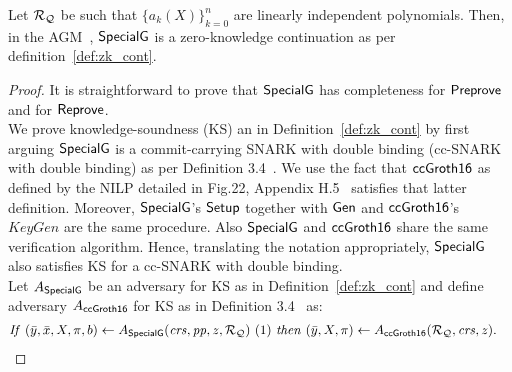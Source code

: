 \begin{theorem}
\label{sec_specialg}
Let $\mathcal{R}_{\mathcal{Q}}$ be such that $\{a_k(X)\}_{k=0}^n$ are linearly independent polynomials. Then, in the 
AGM~\cite{Fuchs_AGM}, ${\mathsf{SpecialG}}$ is a zero-knowledge continuation as per definition~\ref{def:zk_cont}. 
\end{theorem}
\begin{proof} It is straightforward to prove that ${\mathsf{SpecialG}}$ has completeness for ${\mathsf{Preprove}}$ and for ${\mathsf{Reprove}}$. \\

\noindent We prove knowledge-soundness (KS) an in Definition~\ref{def:zk_cont} by first arguing ${\mathsf{SpecialG}}$ is a 
commit-carrying SNARK with double binding (cc-SNARK with double binding) as per Definition 3.4~\cite{LegoSNARK}. 
We use the fact that ${\mathsf{ccGroth16}}$ as defined by the NILP detailed in Fig.22, Appendix H.5~\cite{LegoSNARK} satisfies that latter definition. Moreover, 
${\mathsf{SpecialG}}$'s ${\mathsf{Setup}}$ together with $\mathsf{Gen}$ and ${\mathsf{ccGroth16}}$'s $\mathit{KeyGen}$ are the same procedure. Also ${\mathsf{SpecialG}}$ 
and ${\mathsf{ccGroth16}}$ share the same verification algorithm. Hence, translating the notation appropriately, ${\mathsf{SpecialG}}$ also satisfies KS 
for a cc-SNARK with double binding. \\
\vspace{-0.01cm}
\noindent Let $A_{{\mathsf{SpecialG}}}$ be an adversary for KS as in Definition~\ref{def:zk_cont} and 
define adversary $A_{{\mathsf{ccGroth16}}}$ for KS as in Definition 3.4~\cite{LegoSNARK} as:
\begin{align*}
&\mathit{If} \ (\bar{y}, \bar{x}, X, \pi, b) \leftarrow A_{{\mathsf{SpecialG}}} (\mathit{crs}, \mathit{pp}, z, \mathcal{R}_{\mathcal{Q}})\  (1)\ \mathit{then} \ (\bar{y}, X, \pi) \leftarrow A_{{\mathsf{ccGroth16}}} (\mathcal{R}_{\mathcal{Q}}, \mathit{crs}, z).
\end{align*}


\end{proof}
